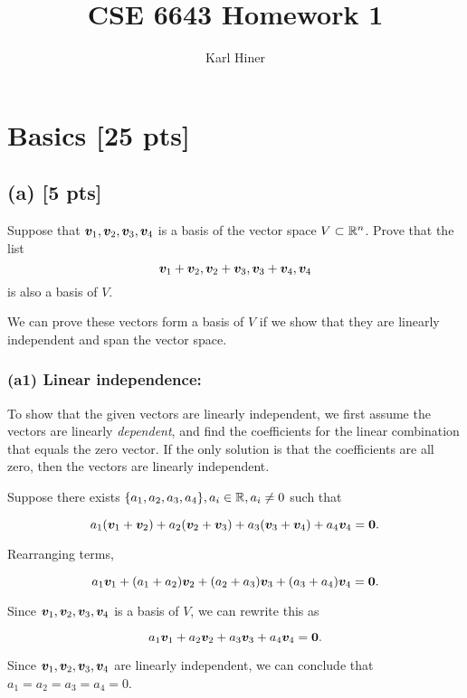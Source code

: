 \documentclass[twoside,10pt]{article}
\newcommand{\eqn}[1]{\begin{equation}#1\end{equation}}
\begin{document}
\title{CSE 6643 Homework 1}
\author{Karl Hiner}
\date{}
\maketitle

\section{Basics [25 pts]}

\subsection*{(a) [5 pts]}
Suppose that $\bm{v}_1, \bm{v}_2, \bm{v}_3, \bm{v}_4$ is a basis of the vector space $V \subset \mathbb{R}^n$. Prove that the list 
\begin{equation}
  \bm{v}_1 + \bm{v}_2, \bm{v}_2 + \bm{v}_3, \bm{v}_3 + \bm{v}_4, \bm{v}_4
\end{equation}
is also a basis of $V$.

We can prove these vectors form a basis of $V$ if we show that they are linearly independent and span the vector space.\\

\subsubsection*{(a1) Linear independence:}

To show that the given vectors are linearly independent, we first assume the vectors are linearly \textit{dependent}, and find the coefficients for the linear combination that equals the zero vector.
If the only solution is that the coefficients are all zero, then the vectors are linearly independent.

Suppose there exists $\{a_1, a_2, a_3, a_4\}, a_i \in \mathbb{R}, a_i \neq 0$ such that

\eqn{a_1(\vct{v}_1 + \vct{v}_2) + a_2(\vct{v}_2 + \vct{v}_3) + a_3(\vct{v}_3 + \vct{v}_4) + a_4\vct{v}_4 = \vct{0}.}

Rearranging terms,

\eqn{a_1\vct{v}_1 + (a_1 + a_2)\vct{v}_2 + (a_2 + a_3)\vct{v}_3 + (a_3 + a_4)\vct{v}_4 = \vct{0}.}

Since $\bm{v}_1, \bm{v}_2, \bm{v}_3, \bm{v}_4$ is a basis of $V$, we can rewrite this as

\eqn{a_1\vct{v}_1 + a_2\vct{v}_2 + a_3\vct{v}_3 + a_4\vct{v}_4 = \vct{0}.}

Since $\bm{v}_1, \bm{v}_2, \bm{v}_3, \bm{v}_4$ are linearly independent, we can conclude that $a_1 = a_2 = a_3 = a_4 = 0$.
\end{document}
